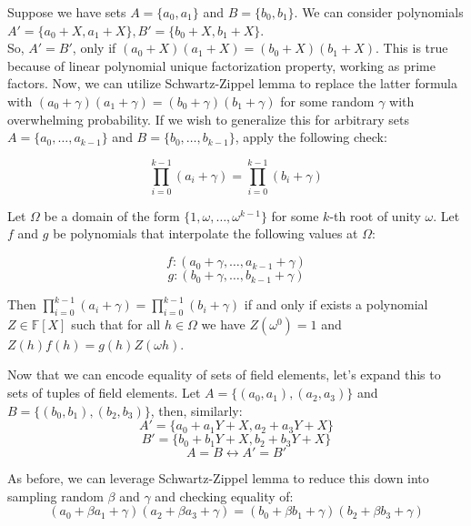 \documentclass{zkdl-presentation-template}
\begin{document}
    \begin{frame}
        Suppose we have sets \(A = \{a_0, a_1\}\) and \(B = \{b_0, b_1\}\). We can consider polynomials \(A' = \{a_0 + X, a_1 + X\}, B' = \{b_0 + X, b_1 + X\}\). 
        \\
        So, \(A' = B'\), only if \((a_0 + X)(a_1 + X) = (b_0 + X)(b_1 + X)\). This is
        true because of linear polynomial unique factorization property, working as
        prime factors. Now, we can utilize Schwartz-Zippel lemma to replace the latter
        formula with \((a_0 + \gamma)(a_1 + \gamma) = (b_0 + \gamma)(b_1 + \gamma)\) for
        some random $\gamma$ with overwhelming probability. If we wish to generalize this
        for arbitrary sets \(A = \{a_0, \ldots, a_{k-1}\}\) and \(B = \{b_0, \ldots, b_{k-1}\}\), apply the following check:

        \[\prod_{i=0}^{k-1} (a_i + \gamma) = \prod_{i=0}^{k-1} (b_i + \gamma)\]
    \end{frame}

    \begin{frame}
        Let $\Omega$ be a domain of the form \(\{1, \omega, \dots, \omega^{k-1}\}\) for some $k$-th root of unity $\omega$. Let $f$ and $g$ be polynomials that interpolate the following values at $\Omega$:

        \[f: (a_0 + \gamma, \ldots, a_{k-1} + \gamma)\]
        \[g: (b_0 + \gamma, \ldots, b_{k-1} + \gamma)\]

        Then \(\prod_{i=0}^{k-1} (a_i + \gamma) = \prod_{i=0}^{k-1} (b_i + \gamma)\) if and only if exists a polynomial $Z \in \mathbb{F}[X]$ such that for all $h \in \Omega$ we have $Z(\omega^{0}) = 1$ and $Z(h)f(h) = g(h)Z(\omega h)$.
    \end{frame}

    \begin{frame}
        Now that we can encode equality of sets of field elements, let's expand this to sets of tuples of field elements. Let \(A = \{(a_0, a_1), (a_2, a_3)\}\) and \(B = \{(b_0, b_1), (b_2, b_3)\}\), then, similarly:
        \[A' = \{a_0 + a_1Y + X, a_2 + a_3Y + X\}\]
        \[B' = \{b_0 + b_1Y + X, b_2 + b_3Y + X\}\]
        \[A = B \leftrightarrow A' = B'\]

        As before, we can leverage Schwartz-Zippel lemma to reduce this down into sampling random $\beta$ and $\gamma$ and checking equality of:
        \[(a_0 + \beta a_1 + \gamma)(a_2 + \beta a_3 + \gamma) = (b_0 + \beta b_1 + \gamma)(b_2 + \beta b_3 + \gamma)\]
    \end{frame}
\end{document}
